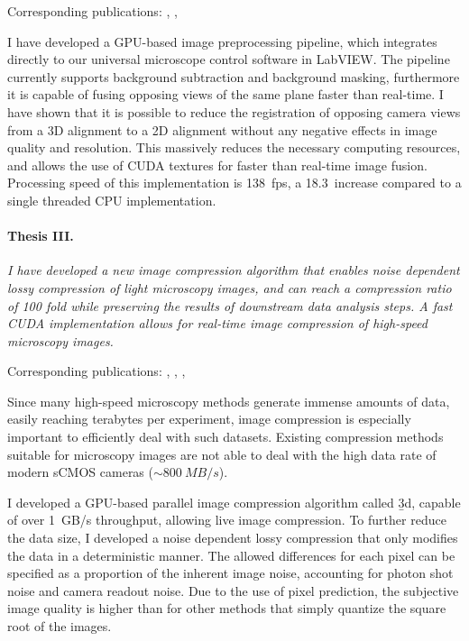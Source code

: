     Corresponding publications: \cite{balazs_gpu-based_2016}, \cite{balazs_gpu-based_2016-1}, \cite{balazs_gpu-based_2017}

    I have developed a GPU-based image preprocessing pipeline, which integrates directly to our universal microscope control software in LabVIEW. The pipeline currently supports background subtraction and background masking, furthermore it is capable of fusing opposing views of the same plane faster than real-time. I have shown that it is possible to reduce the registration of opposing camera views from a 3D alignment to a 2D alignment without any negative effects in image quality and resolution. This massively reduces the necessary computing resources, and allows the use of CUDA textures for faster than real-time image fusion. Processing speed of this implementation is \SI{138}{fps}, a 18.3\texttimes\ increase compared to a single threaded CPU implementation.



  \paragraph{Thesis III.} \textit{I have  developed a new image compression algorithm that enables noise dependent lossy compression of light microscopy images, and can reach a compression ratio of 100 fold while preserving the results of downstream data analysis steps. A fast CUDA implementation allows for real-time image compression of high-speed microscopy images.}

    Corresponding publications: \cite{balazs_real-time_2017}, \cite{balazs_gpu-based_2016}, \cite{balazs_gpu-based_2016-1}, \cite{balazs_gpu-based_2017}
    
    Since many high-speed microscopy methods generate immense amounts of data, easily reaching terabytes per experiment, image compression is especially important to efficiently deal with such datasets. Existing compression methods suitable for microscopy images are not able to deal with the high data rate of modern sCMOS cameras ($\sim \SI{800}{MB/s}$).

    I developed a GPU-based parallel image compression algorithm called \b3d, capable of over \SI{1}{GB/s} throughput, allowing live image compression. To further reduce the data size, I developed a noise dependent lossy compression that only modifies the data in a deterministic manner. The allowed differences for each pixel can be specified as a proportion of the inherent image noise, accounting for photon shot noise and camera readout noise. Due to the use of pixel prediction, the subjective image quality is higher than for other methods that simply quantize the square root of the images.


